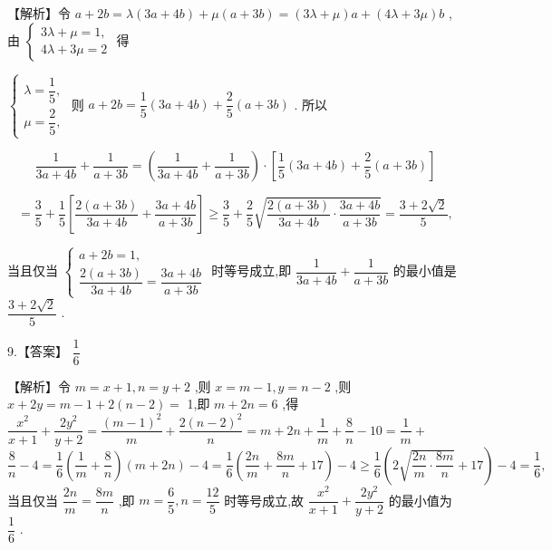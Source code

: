 \documentclass[10pt]{article}
\begin{document}
【解析】令 $a + {2b} = \lambda \left( {{3a} + {4b}}\right)  + \mu \left( {a + {3b}}\right)  = \left( {{3\lambda } + \mu }\right) a + \left( {{4\lambda } + {3\mu }}\right) b$ ,由 $\left\{  \begin{array}{l} {3\lambda } + \mu  = 1, \\  {4\lambda } + {3\mu } = 2 \end{array}\right.$ 得

$\left\{  \begin{array}{l} \lambda  = \dfrac{1}{5}, \\  \mu  = \dfrac{2}{5}, \end{array}\right.$ 则 $a + {2b} = \dfrac{1}{5}\left( {{3a} + {4b}}\right)  + \dfrac{2}{5}\left( {a + {3b}}\right)$ . 所以

\[
\dfrac{1}{{3a} + {4b}} + \dfrac{1}{a + {3b}} = \left( {\dfrac{1}{{3a} + {4b}} + \dfrac{1}{a + {3b}}}\right)  \cdot  \left\lbrack  {\dfrac{1}{5}\left( {{3a} + {4b}}\right)  + \dfrac{2}{5}\left( {a + {3b}}\right) }\right\rbrack
\]

\[
= \dfrac{3}{5} + \dfrac{1}{5}\left\lbrack  {\dfrac{2\left( {a + {3b}}\right) }{{3a} + {4b}} + \dfrac{{3a} + {4b}}{a + {3b}}}\right\rbrack   \geq  \dfrac{3}{5} + \dfrac{2}{5}\sqrt{\dfrac{2\left( {a + {3b}}\right) }{{3a} + {4b}} \cdot  \dfrac{{3a} + {4b}}{a + {3b}}} = \dfrac{3 + 2\sqrt{2}}{5},
\]

当且仅当 $\left\{  \begin{array}{l} a + {2b} = 1, \\  \dfrac{2\left( {a + {3b}}\right) }{{3a} + {4b}} = \dfrac{{3a} + {4b}}{a + {3b}} \end{array}\right.$ 时等号成立,即 $\dfrac{1}{{3a} + {4b}} + \dfrac{1}{a + {3b}}$ 的最小值是 $\dfrac{3 + 2\sqrt{2}}{5}$ .

9.【答案】 $\dfrac{1}{6}$

【解析】令 $m = x + 1,n = y + 2$ ,则 $x = m - 1,y = n - 2$ ,则 $x + {2y} = m - 1 + 2\left( {n - 2}\right)  =$ 1,即 $m + {2n} = 6$ ,得 $\dfrac{{x}^{2}}{x + 1} + \dfrac{2{y}^{2}}{y + 2} = \dfrac{{\left( m - 1\right) }^{2}}{m} + \dfrac{2{\left( n - 2\right) }^{2}}{n} = m + {2n} + \dfrac{1}{m} + \dfrac{8}{n} - {10} = \dfrac{1}{m} +$  $\dfrac{8}{n} - 4 = \dfrac{1}{6}\left( {\dfrac{1}{m} + \dfrac{8}{n}}\right) \left( {m + {2n}}\right)  - 4 = \dfrac{1}{6}\left( {\dfrac{2n}{m} + \dfrac{8m}{n} + {17}}\right)  - 4 \geq  \dfrac{1}{6}\left( {2\sqrt{\dfrac{2n}{m} \cdot  \dfrac{8m}{n}} + {17}}\right)  - 4 = \dfrac{1}{6},$ 当且仅当 $\dfrac{2n}{m} = \dfrac{8m}{n}$ ,即 $m = \dfrac{6}{5},n = \dfrac{12}{5}$ 时等号成立,故 $\dfrac{{x}^{2}}{x + 1} + \dfrac{2{y}^{2}}{y + 2}$ 的最小值为 $\dfrac{1}{6}$ .
\end{document}
